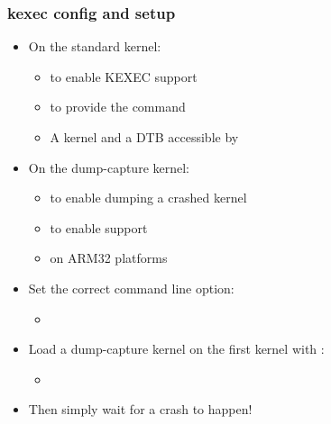\begin{frame}[fragile]
  \frametitle{kexec config and setup}
  \begin{itemize}
    \item On the standard kernel:
    \begin{itemize}
      \item {} to enable KEXEC support
      \item {} to provide the  command
      \item A kernel and a DTB accessible by 
    \end{itemize}
    \item On the dump-capture kernel:
    \begin{itemize}
      \item {} to enable dumping a crashed
            kernel
      \item {} to enable 
        support
      \item {} on ARM32 platforms
    \end{itemize}
    \item Set the correct  command line option:
    \begin{itemize}
      \item {}
    \end{itemize}
    \item Load a dump-capture kernel on the first kernel with :
    \begin{itemize}
      \item {}
    \end{itemize}
    \item Then simply wait for a crash to happen!
  \end{itemize}
\end{frame}

